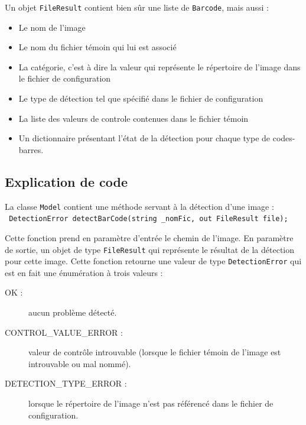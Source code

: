Un objet \verb|FileResult| contient bien sûr une liste de \verb|Barcode|, mais aussi :
\begin{itemize}
\item Le nom de l'image
\item Le nom du fichier témoin qui lui est associé
\item La catégorie, c'est à dire la valeur qui représente le répertoire de l'image dans le fichier de configuration
\item Le type de détection tel que spécifié dans le fichier de configuration
\item La liste des valeurs de controle contenues dans le fichier témoin
\item Un dictionnaire présentant l'état de la détection pour chaque type de codes-barres.
\end{itemize}

\subsection{Explication de code}

La classe \verb|Model| contient une méthode servant à la détection d'une image :\\\verb| DetectionError detectBarCode(string _nomFic, out FileResult file);|

Cette fonction prend en paramètre d'entrée le chemin de l'image. En paramètre de sortie, un objet de type \verb|FileResult| qui représente le résultat de la détection pour cette image. Cette fonction retourne une valeur de type \verb|DetectionError| qui est en fait une énumération à trois valeurs :
\begin{description}
\item[OK :] aucun problème détecté.
\item[CONTROL\_VALUE\_ERROR :] valeur de contrôle introuvable (lorsque le fichier témoin de l'image est introuvable ou mal nommé).
\item[DETECTION\_TYPE\_ERROR :] lorsque le répertoire de l'image n'est pas référencé dans le fichier de configuration.
\end{description}

